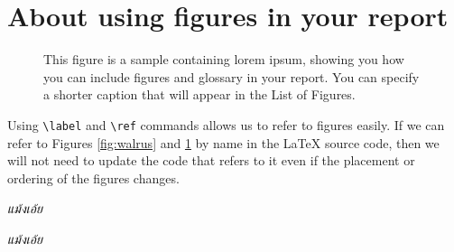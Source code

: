 \section{About using figures in your report}

\newcommand{\loremipsum}{
  \textit{แม้งเอ้ย}\par}

\begin{figure}
  \centering

  \fbox{
     \parbox{.6\textwidth}{\loremipsum}
  }


  \caption[Sample figure]{This figure is a sample containing \gls{lorem ipsum},
  showing you how you can include figures and glossary in your report.
  You can specify a shorter caption that will appear in the List of Figures.}
  \label{fig:sample-figure}
\end{figure}

Using \verb.\label. and \verb.\ref. commands allows us to refer to
figures easily. If we can refer to Figures
\ref{fig:walrus} and \ref{fig:sample-figure} by name in the {\LaTeX}
source code, then we will not need to update the code that refers to it
even if the placement or ordering of the figures changes.

\loremipsum\loremipsum



